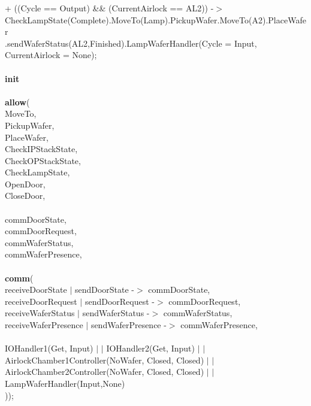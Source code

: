 \documentclass[a4paper,12pt]{article}
\begin{document}
	\\
	\\
	\\
	\\
	\\+ ((Cycle == Output) \&\& (CurrentAirlock == AL2)) -$>$ CheckLampState(Complete).MoveTo(Lamp).PickupWafer.MoveTo(A2).PlaceWafer
	\\.sendWaferStatus(AL2,Finished).LampWaferHandler(Cycle = Input, CurrentAirlock = None);
	\\
	\\\textbf{init} 
	\\
	\\\textbf{			allow}(
	\\						{MoveTo,
		\\ 				 	 PickupWafer,
		\\				 		 PlaceWafer,
		\\	    			 CheckIPStackState,
		\\	  				 CheckOPStackState,
		\\						 CheckLampState,
		\\						 OpenDoor,
		\\						 CloseDoor,
		\\
		\\						 commDoorState,
		\\						 commDoorRequest,
		\\						 commWaferStatus,
		\\						 commWaferPresence},
	\\
	\\\textbf{			comm}(
	\\						{receiveDoorState $|$ sendDoorState -$>$ commDoorState,
		\\						receiveDoorRequest $|$ sendDoorRequest -$>$ commDoorRequest,
		\\	  				 	receiveWaferStatus $|$ sendWaferStatus -$>$ commWaferStatus,
		\\				 	   receiveWaferPresence $|$ sendWaferPresence -$>$ commWaferPresence},
	\\
	\\						 IOHandler1(Get, Input) $|$ $|$ IOHandler2(Get, Input) $|$ $|$ AirlockChamber1Controller(NoWafer, Closed, Closed) $|$ $|$ AirlockChamber2Controller(NoWafer, Closed, Closed) $|$ $|$ LampWaferHandler(Input,None)
	\\					 ));
	\newpage
\end{document}
